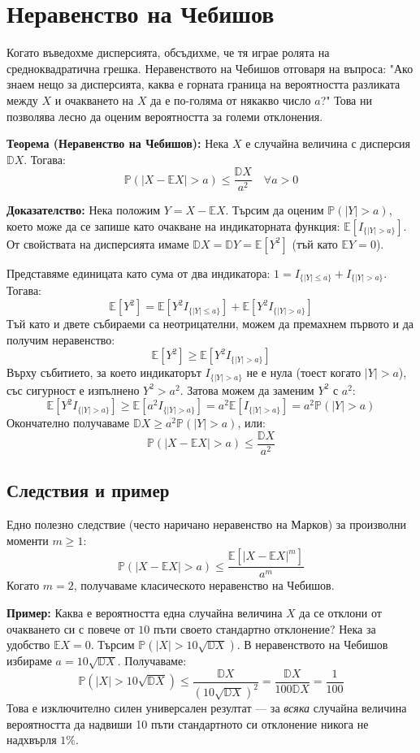 \documentclass{article}
\begin{document}
\section{Неравенство на Чебишов}

Когато въведохме дисперсията, обсъдихме, че тя играе ролята на средноквадратична грешка. Неравенството на Чебишов отговаря на въпроса: "Ако знаем нещо за дисперсията, каква е горната граница на вероятността разликата между $X$ и очакването на $X$ да е по-голяма от някакво число $a$?" Това ни позволява лесно да оценим вероятността за големи отклонения.

\textbf{Теорема (Неравенство на Чебишов):} Нека $X$ е случайна величина с дисперсия $\mathbb{D}X$. Тогава:
\[
\mathbb{P}(|X - \mathbb{E}X| > a) \le \frac{\mathbb{D}X}{a^2} \quad \forall a > 0
\]

\textbf{Доказателство:}
Нека положим $Y = X - \mathbb{E}X$. Търсим да оценим $\mathbb{P}(|Y| > a)$, което може да се запише като очакване на индикаторната функция: $\mathbb{E}[I_{\{|Y| > a\}}]$.
От свойствата на дисперсията имаме $\mathbb{D}X = \mathbb{D}Y = \mathbb{E}[Y^2]$ (тъй като $\mathbb{E}Y = 0$).

Представяме единицата като сума от два индикатора: $1 = I_{\{|Y| \le a\}} + I_{\{|Y| > a\}}$. Тогава:
\[
\mathbb{E}[Y^2] = \mathbb{E}[Y^2 I_{\{|Y| \le a\}}] + \mathbb{E}[Y^2 I_{\{|Y| > a\}}]
\]
Тъй като и двете събираеми са неотрицателни, можем да премахнем първото и да получим неравенство:
\[
\mathbb{E}[Y^2] \ge \mathbb{E}[Y^2 I_{\{|Y| > a\}}]
\]
Върху събитието, за което индикаторът $I_{\{|Y| > a\}}$ не е нула (тоест когато $|Y| > a$), със сигурност е изпълнено $Y^2 > a^2$. Затова можем да заменим $Y^2$ с $a^2$:
\[
\mathbb{E}[Y^2 I_{\{|Y| > a\}}] \ge \mathbb{E}[a^2 I_{\{|Y| > a\}}] = a^2 \mathbb{E}[I_{\{|Y| > a\}}] = a^2 \mathbb{P}(|Y| > a)
\]
Окончателно получаваме $\mathbb{D}X \ge a^2 \mathbb{P}(|Y| > a)$, или:
\[
\mathbb{P}(|X - \mathbb{E}X| > a) \le \frac{\mathbb{D}X}{a^2}
\]

\subsection{Следствия и пример}
Едно полезно следствие (често наричано неравенство на Марков) за произволни моменти $m \ge 1$:
\[
\mathbb{P}(|X - \mathbb{E}X| > a) \le \frac{\mathbb{E}[|X - \mathbb{E}X|^m]}{a^m}
\]
Когато $m=2$, получаваме класическото неравенство на Чебишов.

\textbf{Пример:} Каква е вероятността една случайна величина $X$ да се отклони от очакването си с повече от $10$ пъти своето стандартно отклонение?
Нека за удобство $\mathbb{E}X = 0$. Търсим $\mathbb{P}(|X| > 10\sqrt{\mathbb{D}X})$. В неравенството на Чебишов избираме $a = 10\sqrt{\mathbb{D}X}$. Получаваме:
\[
\mathbb{P}(|X| > 10\sqrt{\mathbb{D}X}) \le \frac{\mathbb{D}X}{(10\sqrt{\mathbb{D}X})^2} = \frac{\mathbb{D}X}{100 \mathbb{D}X} = \frac{1}{100}
\]
Това е изключително силен универсален резултат — за \emph{всяка} случайна величина вероятността да надвиши 10 пъти стандартното си отклонение никога не надхвърля $1\%$. 
\end{document}

